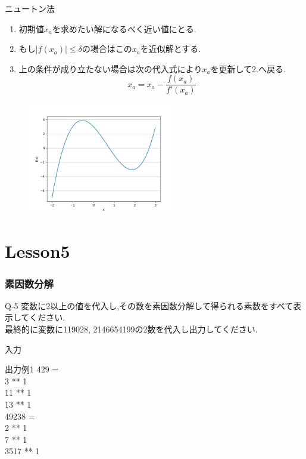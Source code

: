 \documentclass[dvipdfmx]{beamer}
\begin{document}
\begin{frame}
	\begin{itembox}[l]{ニュートン法}
		\begin{enumerate}
			\item 初期値$x_a$を求めたい解になるべく近い値にとる.
			\item もし$\left\lvert f(x_a) \right\lvert \leq \delta $の場合はこの$x_a$を近似解とする.
			\item 上の条件が成り立たない場合は次の代入式により$x_a$を更新して2.へ戻る.
				$$x_a = x_a - \frac{f(x_a)}{f'(x_a)}$$
		\end{enumerate}
	\end{itembox}
	\begin{figure}[h]
		\includegraphics[width=65mm]{Figure_1.png}
	\end{figure}
\end{frame}

\section{Lesson5}
\begin{frame}
	\frametitle{素因数分解}
	\begin{itembox}[l]{Q-5}
		変数に2以上の値を代入し,その数を素因数分解して得られる素数をすべて表示してください.\\
		最終的に変数に119028, 2146654199の2数を代入し出力してください.
	\end{itembox}
	\begin{block}{入力}
	\end{block}
	\begin{block}{出力例1}
		429 =\\
		3 ** 1\\
		11 ** 1\\
		13 ** 1\\
		49238 =\\
		2 ** 1\\
		7 ** 1\\
		3517 ** 1
	\end{block}
\end{frame}
\end{document}

